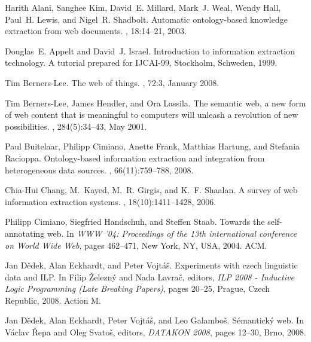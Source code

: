 \begin{thebibliography}{10}

Harith Alani, Sanghee Kim, David~E. Millard, Mark~J. Weal, Wendy Hall, Paul~H.
  Lewis, and Nigel~R. Shadbolt.
\newblock Automatic ontology-based knowledge extraction from web documents.
, 18:14--21, 2003.

Douglas~E. Appelt and David~J. Israel.
\newblock Introduction to information extraction technology.
\newblock A tutorial prepared for {IJCAI-99}, Stockholm, Schweden, 1999.

Tim Berners-Lee.
\newblock The web of things.
, 72:3, January 2008.

Tim Berners-Lee, James Hendler, and Ora Lassila.
\newblock The semantic web, a new form of web content that is meaningful to
  computers will unleash a revolution of new possibilities.
, 284(5):34--43, May 2001.

Paul Buitelaar, Philipp Cimiano, Anette Frank, Matthias Hartung, and Stefania
  Racioppa.
\newblock Ontology-based information extraction and integration from
  heterogeneous data sources.
, 66(11):759--788, 2008.

Chia-Hui Chang, M.~Kayed, M.~R. Girgis, and K.~F. Shaalan.
\newblock A survey of web information extraction systems.
,
  18(10):1411--1428, 2006.

Philipp Cimiano, Siegfried Handschuh, and Steffen Staab.
\newblock Towards the self-annotating web.
\newblock In {\em WWW '04: Proceedings of the 13th international conference on
  World Wide Web}, pages 462--471, New York, NY, USA, 2004. ACM.

Jan D{\v{e}}dek, Alan Eckhardt, and Peter Vojt{\'{a}}{\v{s}}.
\newblock Experiments with czech linguistic data and {ILP}.
\newblock In Filip {\v{Z}}elezn{\'{y}} and Nada Lavra{\v{c}}, editors, {\em
  {ILP} 2008 - Inductive Logic Programming (Late Breaking Papers)}, pages
  20--25, Prague, Czech Republic, 2008. Action M.

Jan D{\v{e}}dek, Alan Eckhardt, Peter Vojt{\'{a}}{\v{s}}, and Leo
  Galambo{\v{s}}.
\newblock S{\'{e}}mantick{\'{y}} web.
\newblock In V{\'{a}}clav {\v{R}}epa and Oleg Svato{\v{s}}, editors, {\em
  {DATAKON} 2008}, pages 12--30, Brno, 2008.


\end{thebibliography}
